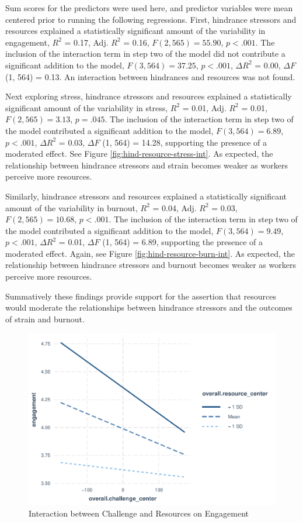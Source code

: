 \documentclass[
  man,mask]{apa7}
\begin{document}
Sum scores for the predictors were used here, and predictor variables were mean centered prior to running the following regressions. First, hindrance stressors and resources explained a statistically significant amount of the variability in engagement, \(R^2\) = 0.17, Adj. \(R^2\) = 0.16, \(F(2, 565) = 55.90\), \(p < .001\). The inclusion of the interaction term in step two of the model did not contribute a significant addition to the model, \(F(3, 564) = 37.25\), \(p < .001\), \(\Delta R^2\) = 0.00, \(\Delta F\) (1, 564) = 0.13. An interaction between hindrances and resources was not found.

Next exploring stress, hindrance stressors and resources explained a statistically significant amount of the variability in stress, \(R^2\) = 0.01, Adj. \(R^2\) = 0.01, \(F(2, 565) = 3.13\), \(p = .045\). The inclusion of the interaction term in step two of the model contributed a significant addition to the model, \(F(3, 564) = 6.89\), \(p < .001\), \(\Delta R^2\) = 0.03, \(\Delta F\) (1, 564) = 14.28, supporting the presence of a moderated effect. See Figure \ref{fig:hind-resource-stress-int}. As expected, the relationship between hindrance stressors and strain becomes weaker as workers perceive more resources.

Similarly, hindrance stressors and resources explained a statistically significant amount of the variability in burnout, \(R^2\) = 0.04, Adj. \(R^2\) = 0.03, \(F(2, 565) = 10.68\), \(p < .001\). The inclusion of the interaction term in step two of the model contributed a significant addition to the model, \(F(3, 564) = 9.49\), \(p < .001\), \(\Delta R^2\) = 0.01, \(\Delta F\) (1, 564) = 6.89, supporting the presence of a moderated effect. Again, see Figure \ref{fig:hind-resource-burn-int}. As expected, the relationship between hindrance stressors and burnout becomes weaker as workers perceive more resources.

Summatively these findings provide support for the assertion that resources would moderate the relationships between hindrance stressors and the outcomes of strain and burnout.

\begin{figure}
\centering
\includegraphics{Submission_files/figure-latex/chal-resource-int-1.pdf}
\caption{\label{fig:chal-resource-int}Interaction between Challenge and Resources on Engagement}
\end{figure}
\end{document}
